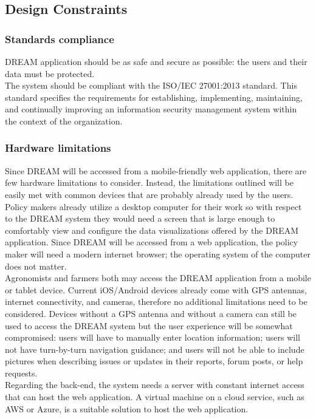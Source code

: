 \subsection{Design Constraints}


\subsubsection{Standards compliance}\label{standards}
DREAM application should be as safe and secure as possible: the users and their data must be protected.\\
The system should be compliant with the ISO/IEC 27001:2013 standard. This standard specifies the requirements for establishing, implementing, maintaining, and continually improving an information security management system within the context of the organization.
\subsubsection{Hardware limitations}

Since DREAM will be accessed from a mobile-friendly web application, there are few hardware limitations to consider. Instead, the limitations outlined will be easily met with common devices that are probably already used by the users.\smallskip\\
Policy makers already utilize a desktop computer for their work so with respect to the DREAM system they would need a screen that is large enough to comfortably view and configure the data visualizations offered by the DREAM application. Since DREAM will be accessed from a web application, the policy maker will need a modern internet browser; the operating system of the computer does not matter.\smallskip\\
Agronomists and farmers both may access the DREAM application from a mobile or tablet device. Current iOS/Android devices already come with GPS antennas, internet connectivity, and cameras, therefore no additional limitations need to be considered. Devices without a GPS antenna and without a camera can still be used to access the DREAM system but the user experience will be somewhat compromised: users will have to manually enter location information; users will not have turn-by-turn navigation guidance; and users will not be able to include pictures when describing issues or updates in their reports, forum posts, or help requests.\smallskip\\
Regarding the back-end, the system needs a server with constant internet access that can host the web application. A virtual machine on a cloud service, such as AWS or Azure, is a suitable solution to host the web application.\\

